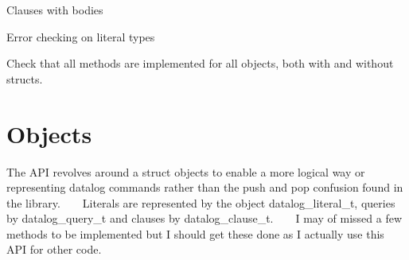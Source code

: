 \begin{DoxyItemize}
\item Clauses with bodies
\item Error checking on literal types
\item Check that all methods are implemented for all objects, both with and without structs. 
\end{DoxyItemize}\hypertarget{index_objects_sec}{}\section{Objects}\label{index_objects_sec}
The A\+PI revolves around a struct objects to enable a more logical way or representing datalog commands rather than the push and pop confusion found in the library. ~\newline
~\newline
 Literals are represented by the object datalog\+\_\+literal\+\_\+t, queries by datalog\+\_\+query\+\_\+t and clauses by datalog\+\_\+clause\+\_\+t. ~\newline
~\newline
 I may of missed a few methods to be implemented but I should get these done as I actually use this A\+PI for other code. 